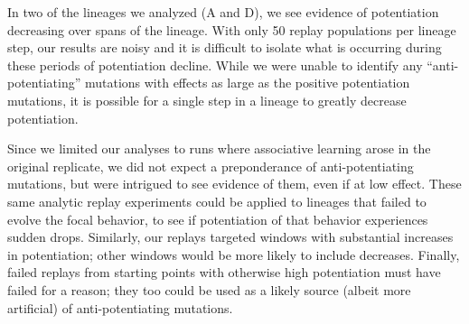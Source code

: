 In two of the lineages we analyzed (A and D), we see evidence of potentiation decreasing over spans of the lineage. 
With only 50 replay populations per lineage step, our results are noisy and it is difficult to isolate what is occurring during these periods of potentiation decline.
While we were unable to identify any ``anti-potentiating'' mutations with effects as large as the positive potentiation mutations, it is possible for a single step in a lineage to greatly decrease potentiation. 

Since we limited our analyses to runs where associative learning arose in the original replicate, we did not expect a preponderance of anti-potentiating mutations, but were intrigued to see evidence of them, even if at low effect.  
These same analytic replay experiments could be applied to lineages that failed to evolve the focal behavior, to see if potentiation of that behavior experiences sudden drops. 
Similarly, our replays targeted windows with substantial increases in potentiation; other windows would be more likely to include decreases. 
Finally, failed replays from starting points with otherwise high potentiation must have failed for a reason; they too could be used as a likely source (albeit more artificial) of anti-potentiating mutations.





